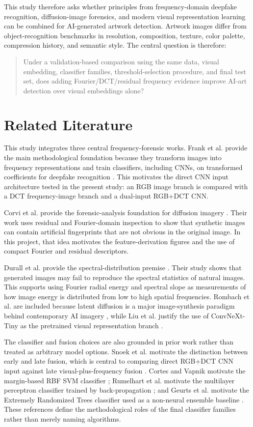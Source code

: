 ﻿\documentclass[10pt,twocolumn]{article}
\begin{document}
This study therefore asks whether principles from frequency-domain deepfake recognition, diffusion-image forensics, and modern visual representation learning can be combined for AI-generated artwork detection. Artwork images differ from object-recognition benchmarks in resolution, composition, texture, color palette, compression history, and semantic style. The central question is therefore:

\begin{quote}
Under a validation-based comparison using the same data, visual embedding, classifier families, threshold-selection procedure, and final test set, does adding Fourier/DCT/residual frequency evidence improve AI-art detection over visual embeddings alone?
\end{quote}

\section{Related Literature}
This study integrates three central frequency-forensic works. Frank et al. provide the main methodological foundation because they transform images into frequency representations and train classifiers, including CNNs, on transformed coefficients for deepfake recognition \cite{frank}. This motivates the direct CNN input architecture tested in the present study: an RGB image branch is compared with a DCT frequency-image branch and a dual-input RGB+DCT CNN.

Corvi et al. provide the forensic-analysis foundation for diffusion imagery \cite{corvi}. Their work uses residual and Fourier-domain inspection to show that synthetic images can contain artificial fingerprints that are not obvious in the original image. In this project, that idea motivates the feature-derivation figures and the use of compact Fourier and residual descriptors.

Durall et al. provide the spectral-distribution premise \cite{durall}. Their study shows that generated images may fail to reproduce the spectral statistics of natural images. This supports using Fourier radial energy and spectral slope as measurements of how image energy is distributed from low to high spatial frequencies. Rombach et al. are included because latent diffusion is a major image-synthesis paradigm behind contemporary AI imagery \cite{rombach}, while Liu et al. justify the use of ConvNeXt-Tiny as the pretrained visual representation branch \cite{convnext}.

The classifier and fusion choices are also grounded in prior work rather than treated as arbitrary model options. Snoek et al. motivate the distinction between early and late fusion, which is central to comparing direct RGB+DCT CNN input against late visual-plus-frequency fusion \cite{snoek}. Cortes and Vapnik motivate the margin-based RBF SVM classifier \cite{cortes}; Rumelhart et al. motivate the multilayer perceptron classifier trained by back-propagation \cite{rumelhart}; and Geurts et al. motivate the Extremely Randomized Trees classifier used as a non-neural ensemble baseline \cite{geurts}. These references define the methodological roles of the final classifier families rather than merely naming algorithms.
\end{document}
